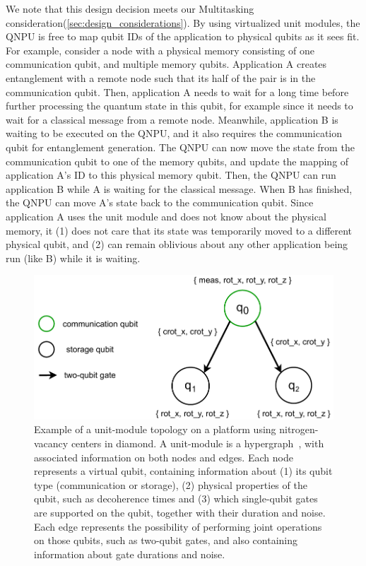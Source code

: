 We note that this design decision meets our Multitasking consideration(\cref{sec:design_considerations}).
By using virtualized unit modules, the \ac{QNPU} is free to map qubit IDs of the application to physical qubits as it sees fit.
For example, consider a node with a physical memory consisting of one communication qubit, and multiple memory qubits.
Application A creates entanglement with a remote node such that its half of the pair is in the communication qubit.
Then, application A needs to wait for a long time before further processing the quantum state in this qubit, for example since it needs to wait for a classical message from a remote node.
Meanwhile, application B is waiting to be executed on the \ac{QNPU}, and it also requires the communication qubit for entanglement generation.
The \ac{QNPU} can now move the state from the communication qubit to one of the memory qubits, and update the mapping of application A's ID to this physical memory qubit.
Then, the \ac{QNPU} can run application B while A is waiting for the classical message.
When B has finished, the \ac{QNPU} can move A's state back to the communication qubit.
Since application A uses the unit module and does not know about the physical memory, it
    (1) does not care that its state was temporarily moved to a different physical qubit, and
    (2) can remain oblivious about any other application being run (like B) while it is waiting.


\begin{figure}[t]
      \centering
      \includegraphics[width=0.6\linewidth]{figures/netqasm/unit-module.pdf}
      \caption{Example of a unit-module topology on a platform using
            nitrogen-vacancy centers in diamond. A unit-module is a
            hypergraph~\cite{berge1984hypergraphs}, with associated information
            on both nodes and edges. Each node represents a virtual qubit,
            containing information about (1) its qubit type (communication or
            storage), (2) physical properties of the qubit, such as decoherence
            times and (3) which single-qubit gates are supported on the qubit,
            together with their duration and noise. Each edge represents the
            possibility of performing joint operations on those qubits, such as
            two-qubit gates, and also containing information about gate
            durations and noise.}
      \label{fig:topology}
\end{figure}



